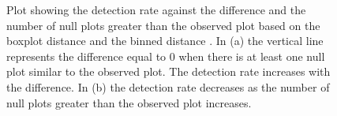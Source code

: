 \documentclass[12]{article}
\begin{document}
\begin{figure}[hbtp]
\centering
{}
	\vspace{-.1in}
\caption[Optional caption for list of figures]{Plot showing the detection rate against the difference and the number of null plots greater than the observed plot based on the boxplot distance and  the binned distance . In (a) the vertical line represents the difference equal to 0 when there is at least one null plot similar to the observed plot. The detection rate increases with the difference. In (b) the detection rate decreases as the number of null plots greater than the observed plot increases.  }
\label{turk1comp}
\end{figure}

\end{document}
